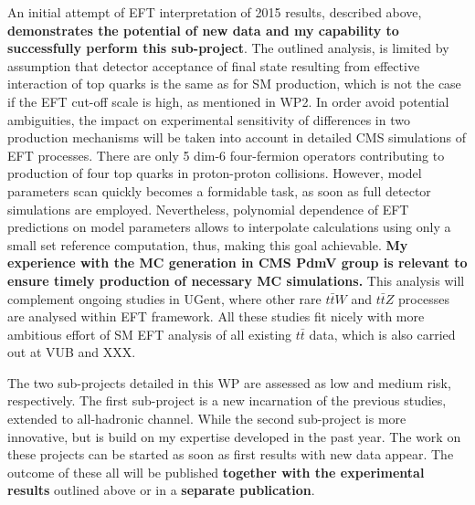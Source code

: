 An initial attempt of EFT interpretation of 2015 results, described above, \textbf{demonstrates the potential of new data and my capability to successfully perform this sub-project}. The outlined analysis, is limited by assumption that detector acceptance of \tttt final state resulting from effective interaction of top quarks is the same as for SM \tttt production, which is not the case if the EFT cut-off scale is high, as mentioned in WP2. In order avoid potential ambiguities, the impact on experimental sensitivity of  differences in two production mechanisms will be taken into account in detailed CMS simulations of EFT processes. There are only 5 dim-6 four-fermion operators contributing to production of four top quarks in proton-proton collisions. However, model parameters scan quickly becomes a formidable task, as soon as full detector simulations are employed. Nevertheless, polynomial dependence of EFT predictions on model parameters allows to interpolate calculations using only a small set reference computation, thus, making this goal achievable. \textbf{My experience with the MC generation in CMS PdmV group is relevant to ensure timely production of necessary MC simulations.} This analysis will complement ongoing studies in UGent, where other rare $t\bar{t}W$ and $t\bar{t}Z$ processes are analysed within EFT framework. All these studies fit nicely with more ambitious effort of SM EFT analysis of all existing $t\bar{t}$ data, which is also carried out at VUB and XXX. 

The two sub-projects detailed in this WP are assessed as low and medium risk, respectively. The first sub-project is a new incarnation of the previous studies, extended to all-hadronic channel. While the second sub-project is more innovative, but is build on my expertise developed in the past year. The work on these projects can be started as soon as first results with new data appear. The outcome of these all will be published \textbf{together with the experimental results} outlined above or in a \textbf{separate publication}.

